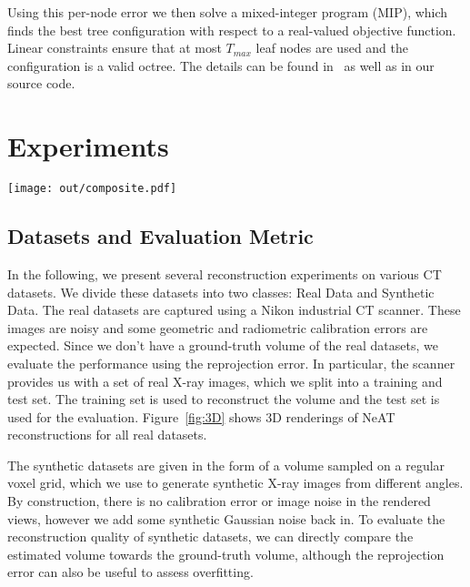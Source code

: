 \documentclass[acmtog,nonacm]{acmart} \acmSubmissionID{0438}
\newcommand{\neat}{NeAT\xspace}
\begin{document}
Using this per-node error we then solve a mixed-integer program (MIP), which finds the best tree configuration with respect to a real-valued objective function.  Linear constraints ensure that at most $T_{max}$ leaf nodes are used and the configuration is a valid octree.
The details can be found in~\cite{martel2021acorn} as well as in our source code.

 \section{Experiments}



\begin{figure*}
\texttt{[image: out/composite.pdf]}
  \caption{
  3D volume renderings of the real datasets, as reconstructed
  by NeRF and \neat using 25-50 projections. From left to right: ceramic coral, pepper, pomegranate, wind-up teapot. See Figure \ref{fig:real_recons} for a 2D slice comparison. }
  \label{fig:3D}
\end{figure*}

\subsection{Datasets and Evaluation Metric}
In the following, we present several reconstruction experiments on various CT datasets.
We divide these datasets into two classes: Real Data and Synthetic Data.
The real datasets are captured using a Nikon industrial CT scanner.
These images are noisy and some geometric and radiometric calibration errors are expected.
Since we don't have a ground-truth volume of the real datasets, we evaluate the performance using the reprojection error. 
In particular, the scanner provides us with a set of real X-ray images, which we split into a training and test set.
The training set is used to reconstruct the volume and the test set is used for the evaluation.
Figure~\ref{fig:3D} shows 3D renderings of \neat reconstructions for
all real datasets.


The synthetic datasets are given in the form of a volume sampled on a
regular voxel grid, which we use to generate synthetic X-ray images
from different angles.  By construction, there is no calibration error
or image noise in the rendered views, however we add some synthetic
Gaussian noise back in.  To evaluate the reconstruction quality of
synthetic datasets, we can directly compare the estimated volume
towards the ground-truth volume, although the reprojection error can
also be useful to assess overfitting.
\end{document}
